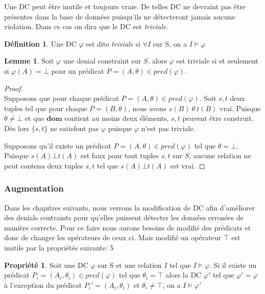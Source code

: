 \documentclass[letterpaper, 12pt]{report}
\theoremstyle{definition}
\newtheorem{mydef}{Définition}
\newtheorem{myprop}{Propriété}
\newtheorem{mylemma}{Lemme}
\newcommand{\dom}{\mathbf{dom}}
\newcommand{\alinea}{
\hspace*{0.5cm}}
\begin{document}
Une DC peut être inutile et toujours vraie. De telles DC ne devraint pas être présentes dans la base de données puisqu'ils ne détecteront jamais aucune violation. Dans ce cas on dira que le DC est \emph{triviale}. 
\begin{mydef}
	Une DC $\varphi$ est dite \emph{triviale} si $\forall I$ sur S, on a $I \models \varphi$
\end{mydef}

\begin{mylemma} \label{trivialLemma}
Soit $\varphi$ une denial constraint sur $S$. alors $\varphi$ est triviale si et seulement si $\varphi(A) = \bot$ pour un prédicat $P=(A,\theta) \in pred(\varphi)$.
\end{mylemma}
\begin{proof}
~\\
\alinea \framebox{$\implies$}
Supposons que pour chaque prédicat $P=(A,\theta) \in pred(\varphi)$. Soit $s,t$ deux tuples tel que pour chaque $P=(B,\theta)$, nous avons $s(B)\ \theta\ t(B)$ vrai.
Puisque $\theta \neq \bot$ et que $\dom$ contient au moins deux éléments, $s,t$ peuvent être construit. Dès lors $\{s,t\}$ ne satisfont pas $\varphi$ puisque $\varphi$ n'est pas triviale.

\framebox{$\impliedby$}
Supposons qu'il existe un prédicat $P=(A,\theta) \in pred (\varphi)$ tel que $\theta = \bot$.
Puisque $s(A) \bot t(A)$ est faux pour tout tuples $s,t$ sur $S$, aucune relation ne peut contenu deux tuples $s,t$ tel que $s(A) \bot t(A)$ est vrai.
\end{proof}


\subsubsection{Augmentation}

Dans les chapitres suivants, nous verrons la modification de DC afin d'améliorer des denials contraints pour qu'elles puissent détecter les données erronées de manière correcte. Pour ce faire nous aurons besoins de modifié des prédicats et donc de changer les opérateurs de ceux ci. Mais modifié un opérateur $\top$ est inutile par la propriétés suivante:
5
\begin{myprop}
	Soit une DC $\varphi$ sur S et une relation $I$ tel que $I \models \varphi$. Si il existe un prédicat $P_i = (A_i,\theta_i) \in pred(\varphi)$ tel que $\theta_i = \top$ alors la DC $\varphi'$ tel que $\varphi' = \varphi$ à l'exception du prédicat $P_i' =(A_i,\theta_i)$ et $\theta_i \neq \top$, on a $I \models \varphi'$
\end{myprop}
\end{document}
